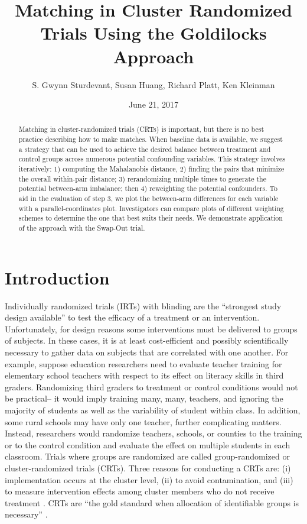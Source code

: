 \documentclass[]{article}
\title{Matching in Cluster Randomized Trials Using the Goldilocks Approach}
\author{S. Gwynn Sturdevant, Susan Huang, Richard Platt, Ken Kleinman}
\date{June 21, 2017}
\begin{document}
\maketitle
\begin{abstract}
Matching in cluster-randomized trials (CRTs) is important, but there is
no best practice describing how to make matches. When baseline data is
available, we suggest a strategy that can be used to achieve the desired
balance between treatment and control groups across numerous potential
confounding variables. This strategy involves iteratively: 1) computing
the Mahalanobis distance, 2) finding the pairs that minimize the overall
within-pair distance; 3) rerandomizing multiple times to generate the
potential between-arm imbalance; then 4) reweighting the potential
confounders. To aid in the evaluation of step 3, we plot the between-arm
differences for each variable with a parallel-coordinates plot.
Investigators can compare plots of different weighting schemes to
determine the one that best suits their needs. We demonstrate
application of the approach with the Swap-Out trial.
\end{abstract}

\section{Introduction}\label{introduction}

Individually randomized trials (IRTs) with blinding are the ``strongest
study design available'' \citep{gatsonis2017methods} to test the
efficacy of a treatment or an intervention. Unfortunately, for design
reasons some interventions must be delivered to groups of subjects. In
these cases, it is at least cost-efficient and possibly scientifically
necessary to gather data on subjects that are correlated with one
another. For example, suppose education researchers need to evaluate
teacher training for elementary school teachers with respect to its
effect on literacy skills in third graders. Randomizing third graders to
treatment or control conditions would not be practical-- it would imply
training many, many, teachers, and ignoring the majority of students as
well as the variability of student within class. In addition, some rural
schools may have only one teacher, further complicating matters.
Instead, researchers would randomize teachers, schools, or counties to
the training or to the control condition and evaluate the effect on
multiple students in each classroom. Trials where groups are randomized
are called group-randomized or cluster-randomized trials (CRTs). Three
reasons for conducting a CRTs are: (i) implementation occurs at the
cluster level, (ii) to avoid contamination, and (iii) to measure
intervention effects among cluster members who do not receive treatment
\citep{balzer2012match, CRTrials2009}. CRTs are ``the gold standard when
allocation of identifiable groups is necessary''
\citep{murray2004design}.
\end{document}
